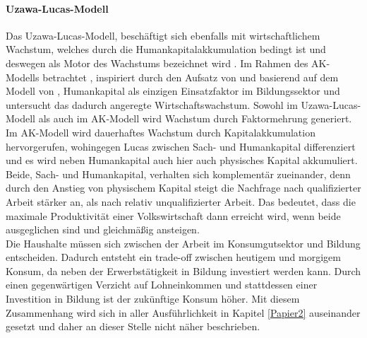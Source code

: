 \paragraph{Uzawa-Lucas-Modell}
Das Uzawa-Lucas-Modell, besch{\"a}ftigt sich ebenfalls mit wirtschaftlichem Wachstum, welches durch die Humankapitalakkumulation bedingt ist und deswegen als Motor des Wachstums bezeichnet wird \citep{Lucas.1988}. Im Rahmen des AK-Modells \citep{Rebelo.1991} betrachtet \citet{Lucas.1988}, inspiriert durch den Aufsatz von \citet{Becker.1964} und basierend auf dem Modell von \citet{Uzawa.1965}, Humankapital als einzigen Einsatzfaktor im Bildungssektor und untersucht das dadurch angeregte Wirtschaftswachstum. Sowohl im Uzawa-Lucas-Modell als auch im AK-Modell wird Wachstum durch Faktormehrung generiert. Im AK-Modell wird dauerhaftes Wachstum durch Kapitalakkumulation hervorgerufen, wohingegen Lucas zwischen Sach- und Humankapital differenziert und es wird neben Humankapital auch hier auch physisches Kapital akkumuliert. Beide, Sach- und Humankapital, verhalten sich komplement{\"a}r zueinander, denn durch den Anstieg von physischem Kapital steigt die Nachfrage nach qualifizierter Arbeit st{\"a}rker an, als nach relativ unqualifizierter Arbeit. Das bedeutet, dass die maximale Produktivit{\"a}t einer Volkswirtschaft dann erreicht wird, wenn beide ausgeglichen sind und gleichmä{\ss}ig ansteigen.\\


Die Haushalte müssen sich zwischen der Arbeit im Konsumgutsektor und Bildung entscheiden. Dadurch entsteht ein trade-off zwischen heutigem und morgigem Konsum, da neben der Erwerbstätigkeit in Bildung investiert werden kann. Durch einen gegenwärtigen Verzicht auf Lohneinkommen und stattdessen einer Investition in Bildung ist der zuk{\"u}nftige Konsum h{\"o}her. Mit diesem Zusammenhang wird sich in aller Ausführlichkeit in Kapitel \ref{Papier2} auseinander gesetzt und daher an dieser Stelle nicht näher beschrieben.


